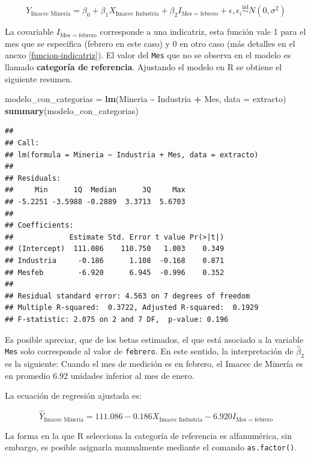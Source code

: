 \documentclass[
  11pt,
]{book}
\newenvironment{Shaded}{\begin{snugshade}}{\end{snugshade}}
\newcommand{\AttributeTok}[1]{\textcolor[rgb]{0.13,0.29,0.53}{#1}}
\newcommand{\FunctionTok}[1]{\textcolor[rgb]{0.13,0.29,0.53}{\textbf{#1}}}
\newcommand{\NormalTok}[1]{#1}
\newcommand{\OtherTok}[1]{\textcolor[rgb]{0.56,0.35,0.01}{#1}}
\newcommand{\SpecialCharTok}[1]{\textcolor[rgb]{0.81,0.36,0.00}{\textbf{#1}}}
\theoremstyle{definition}
\theoremstyle{definition}
\theoremstyle{definition}
\theoremstyle{definition}
\theoremstyle{remark}
\begin{document}
\[Y_{\text{Imacec Minería}} = \beta_0 + \beta_1X_{\text{Imacec Industria}} + \beta_2I_{\text{Mes = febrero}} + \epsilon, \epsilon_i \overset{\text{iid}}{\sim} N(0,\sigma^2)\]

La covariable \(I_{\text{Mes = febrero}}\) corresponde a una indicatriz, esta función vale 1 para el mes que se especifica (febrero en este caso) y 0 en otro caso (más detalles en el anexo \ref{funcion-indicatriz}). El valor del \texttt{Mes} que no se observa en el modelo es llamado \textbf{categoría de referencia}. Ajustando el modelo en R se obtiene el siguiente resumen.

\begin{Shaded}
\begin{Highlighting}[]
\NormalTok{modelo\_con\_categorias }\OtherTok{=} \FunctionTok{lm}\NormalTok{(Mineria }\SpecialCharTok{\textasciitilde{}}\NormalTok{ Industria }\SpecialCharTok{+}\NormalTok{ Mes, }\AttributeTok{data =}\NormalTok{ extracto) }
\FunctionTok{summary}\NormalTok{(modelo\_con\_categorias)}
\end{Highlighting}
\end{Shaded}

\begin{verbatim}
## 
## Call:
## lm(formula = Mineria ~ Industria + Mes, data = extracto)
## 
## Residuals:
##     Min      1Q  Median      3Q     Max 
## -5.2251 -3.5988 -0.2889  3.3713  5.6703 
## 
## Coefficients:
##             Estimate Std. Error t value Pr(>|t|)
## (Intercept)  111.086    110.750   1.003    0.349
## Industria     -0.186      1.108  -0.168    0.871
## Mesfeb        -6.920      6.945  -0.996    0.352
## 
## Residual standard error: 4.563 on 7 degrees of freedom
## Multiple R-squared:  0.3722, Adjusted R-squared:  0.1929 
## F-statistic: 2.075 on 2 and 7 DF,  p-value: 0.196
\end{verbatim}

Es posible apreciar, que de los betas estimados, el que está asociado a la variable \texttt{Mes} solo corresponde al valor de \texttt{febrero}. En este sentido, la interpretación de \(\widehat{\beta}_2\) es la siguiente: Cuando el mes de medición es en febrero, el Imacec de Minería es en promedio 6.92 unidades inferior al mes de enero.

La ecuación de regresión ajustada es:

\[\widehat{Y}_{\text{Imacec Minería}} = 111.086 - 0.186X_{\text{Imacec Industria}} - 6.920I_{\text{Mes = febrero}}\]

La forma en la que R selecciona la categoría de referencia es alfanumérica, sin embargo, es posible asignarla manualmente mediante el comando \texttt{as.factor()}.
\end{document}
